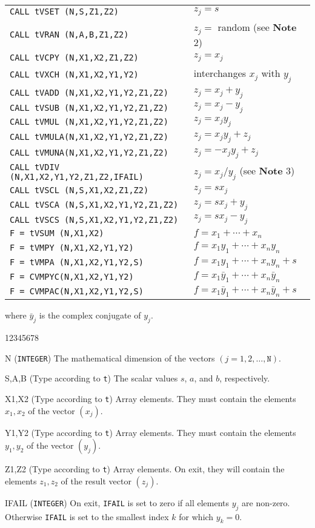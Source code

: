 \begin{center}
\begin{tabular}{l@{\qquad}l}
{\tt CALL tVSET (N,S,Z1,Z2)} & $z_j=s$ \\
{\tt CALL tVRAN (N,A,B,Z1,Z2)} & $z_j=$ random (see {\bf Note} 2)\\
{\tt CALL tVCPY (N,X1,X2,Z1,Z2)} & $z_j=x_j$ \\
{\tt CALL tVXCH (N,X1,X2,Y1,Y2)} & interchanges $x_j$ with $y_j$ \\
{\tt CALL tVADD (N,X1,X2,Y1,Y2,Z1,Z2)} & $z_j=x_j+y_j$ \\
{\tt CALL tVSUB (N,X1,X2,Y1,Y2,Z1,Z2)} & $z_j=x_j-y_j$ \\
{\tt CALL tVMUL (N,X1,X2,Y1,Y2,Z1,Z2)} & $z_j=x_jy_j$ \\
{\tt CALL tVMULA(N,X1,X2,Y1,Y2,Z1,Z2)} & $z_j=x_jy_j+z_j$ \\
{\tt CALL tVMUNA(N,X1,X2,Y1,Y2,Z1,Z2)} & $z_j=-x_jy_j+z_j$ \\
{\tt CALL tVDIV (N,X1,X2,Y1,Y2,Z1,Z2,IFAIL)} & $z_j=x_j/y_j$
(see {\bf Note} 3) \\
{\tt CALL tVSCL (N,S,X1,X2,Z1,Z2)} & $z_j=sx_j$ \\
{\tt CALL tVSCA (N,S,X1,X2,Y1,Y2,Z1,Z2)} & $z_j=sx_j+y_j$ \\
{\tt CALL tVSCS (N,S,X1,X2,Y1,Y2,Z1,Z2)} & $z_j=sx_j-y_j$ \\
{\tt F =  tVSUM (N,X1,X2)} & $f = x_1+ \cdots +x_n$ \\
{\tt F =  tVMPY (N,X1,X2,Y1,Y2)} & $f = x_1y_1+ \cdots +x_ny_n$ \\
{\tt F =  tVMPA (N,X1,X2,Y1,Y2,S)} & $f = x_1y_1+ \cdots +x_ny_n+s$ \\
{\tt F =  CVMPYC(N,X1,X2,Y1,Y2)} &
                     $f = x_1\bar{y}_1+ \cdots +x_n\bar{y}_n$ \\
{\tt F =  CVMPAC(N,X1,X2,Y1,Y2,S)} &
                     $f = x_1\bar{y}_1+ \cdots +x_n\bar{y}_n+s$
\end{tabular}
\end{center}
where $\bar{y}_j$ is the complex conjugate of $y_j$.
\newpage
\begin{DLtt}{12345678}
\item[N] ({\tt INTEGER}) The mathematical dimension of the vectors
$(j = 1,2,\ldots,\mathtt{N})$.
\item[S,A,B] (Type according to {\tt t}) The scalar values $s$, $a$,
and $b$, respectively.
\item[X1,X2] (Type according to {\tt t}) Array elements. They must
contain the elements $x_1,x_2$ of the vector $(x_j)$.
\item[Y1,Y2] (Type according to {\tt t}) Array elements. They must
contain the elements $y_1,y_2$ of the vector $(y_j)$.
\item[Z1,Z2] (Type according to {\tt t}) Array elements. On exit, they
will contain the elements $z_1,z_2$ of the result vector $(z_j)$.
\item[IFAIL] ({\tt INTEGER}) On exit, {\tt IFAIL} is set to zero if all
elements $y_j$ are non-zero. Otherwise {\tt IFAIL} is set to the smallest
index $k$ for which $y_k = 0$.
\end{DLtt}

